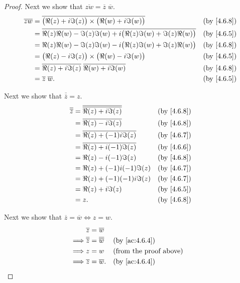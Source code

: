 \begin{proof}
  Next we show that \(\overline{zw} = \overline{z} \; \overline{w}\).
  \begin{align*}
    \overline{zw} & = \overline{\big(\Re(z) + i \Im(z)\big) \times \big(\Re(w) + i \Im(w)\big)}            &  & \by{4.6.8} \\
                  & = \overline{\Re(z) \Re(w) - \Im(z) \Im(w) + i \big(\Re(z) \Im(w) + \Im(z) \Re(w)\big)} &  & \by{4.6.5} \\
                  & = \Re(z) \Re(w) - \Im(z) \Im(w) - i \big(\Re(z) \Im(w) + \Im(z) \Re(w)\big)            &  & \by{4.6.8} \\
                  & = \big(\Re(z) - i \Im(z)\big) \times \big(\Re(w) - i \Im(w)\big)                       &  & \by{4.6.5} \\
                  & = \overline{\Re(z) + i \Im(z)} \; \overline{\Re(w) + i \Im(w)}                         &  & \by{4.6.8} \\
                  & = \overline{z} \; \overline{w}.                                                        &  & \by{4.6.5}
  \end{align*}

  Next we show that \(\overline{\overline{z}} = z\).
  \begin{align*}
    \overline{\overline{z}} & = \overline{\overline{\Re(z) + i \Im(z)}} &  & \by{4.6.8} \\
                            & = \overline{\Re(z) - i \Im(z)}            &  & \by{4.6.8} \\
                            & = \overline{\Re(z) + (-1) i \Im(z)}       &  & \by{4.6.7} \\
                            & = \overline{\Re(z) + i (-1) \Im(z)}       &  & \by{4.6.6} \\
                            & = \Re(z) - i (-1) \Im(z)                  &  & \by{4.6.8} \\
                            & = \Re(z) + (-1) i (-1) \Im(z)             &  & \by{4.6.7} \\
                            & = \Re(z) + (-1) (-1) i \Im(z)             &  & \by{4.6.7} \\
                            & = \Re(z) + i \Im(z)                       &  & \by{4.6.5} \\
                            & = z.                                      &  & \by{4.6.8}
  \end{align*}

  Next we show that \(\overline{z} = \overline{w} \iff z = w\).
  \begin{align*}
             & \overline{z} = \overline{w}                                                          \\
    \implies & \overline{\overline{z}} = \overline{\overline{w}} &  & \text{(by \cref{ac:4.6.4})}   \\
    \implies & z = w                                             &  & \text{(from the proof above)} \\
    \implies & \overline{z} = \overline{w}.                      &  & \text{(by \cref{ac:4.6.4})}
  \end{align*}


\end{proof}
